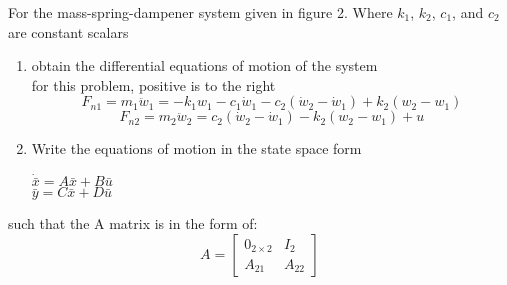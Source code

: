 
\item For the mass-spring-dampener system given in figure 2. Where $k_1$, $k_2$, $c_1$, and $c_2$ are constant
  scalars
  \begin{enumerate}
  \item obtain the differential equations of motion of the system \\
  for this problem, positive is to the right
  \begin{equation}
    F_{n1} = m_1\ddot w_1 = -k_1w_1 - c_1\dot w_1 - c_2(\dot w_2-\dot w_1) + k_2(w_2 - w_1)
  \end{equation}
  \begin{equation}
    F_{n2} = m_2\ddot w_2 = c_2(\dot w_2-\dot w_1) - k_2(w_2 - w_1) + u
  \end{equation}
  
  \item Write the equations of motion in the state space form
    \begin{center}
      $\dot {\bar x} = A\bar x + B\bar u$\\
      $\bar y = C\bar x + D\bar u$
    \end{center}
  \end{enumerate}
  such that the A matrix is in the form of:
  \begin{equation}
    A =
    \begin{bmatrix}
      0_{2 \times 2} & I_2 \\
      A_{21} & A_{22}
    \end{bmatrix}
  \end{equation} \\

